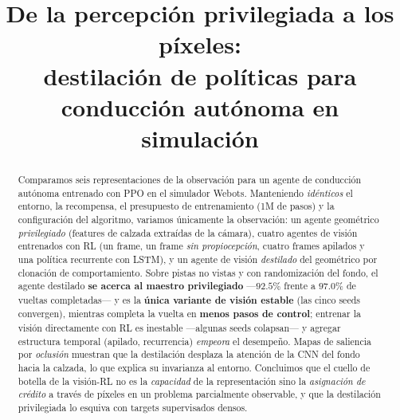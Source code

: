 \documentclass[conference]{IEEEtran}
\begin{document}
\title{De la percepci\'on privilegiada a los p\'ixeles:\\
destilaci\'on de pol\'iticas para conducci\'on aut\'onoma en simulaci\'on}


\maketitle
\raggedbottom

\begin{abstract}
Comparamos seis representaciones de la observaci\'on para un agente de conducci\'on
aut\'onoma entrenado con PPO en el simulador Webots. Manteniendo
\emph{id\'enticos} el entorno, la recompensa, el presupuesto de entrenamiento (1M de pasos)
y la configuraci\'on del algoritmo, variamos \'unicamente la observaci\'on: un agente
geom\'etrico \emph{privilegiado} (features de calzada extra\'idas de la c\'amara), cuatro
agentes de visi\'on entrenados con RL (un frame, un frame \emph{sin propiocepci\'on}, cuatro
frames apilados y una pol\'itica recurrente con LSTM), y un agente de visi\'on \emph{destilado}
del geom\'etrico por clonaci\'on de comportamiento. Sobre pistas no vistas y con randomizaci\'on
del fondo, el agente destilado \textbf{se acerca al maestro privilegiado} ---$92.5\%$ frente a
$97.0\%$ de vueltas completadas--- y es la \textbf{\'unica variante de visi\'on estable} (las cinco
seeds convergen), mientras completa la vuelta en \textbf{menos pasos de control}; entrenar la
visi\'on directamente con RL es inestable ---algunas seeds colapsan--- y
agregar estructura temporal (apilado, recurrencia) \emph{empeora} el desempe\~no. Mapas de
saliencia por \emph{oclusi\'on} muestran que la destilaci\'on desplaza la atenci\'on de
la CNN del fondo hacia la calzada, lo que explica su invarianza al entorno. Concluimos que el
cuello de botella de la visi\'on-RL no es la \emph{capacidad} de la representaci\'on sino la
\emph{asignaci\'on de cr\'edito} a trav\'es de p\'ixeles en un problema parcialmente
observable, y que la destilaci\'on privilegiada lo esquiva con targets supervisados densos.
\end{abstract}
\end{document}
